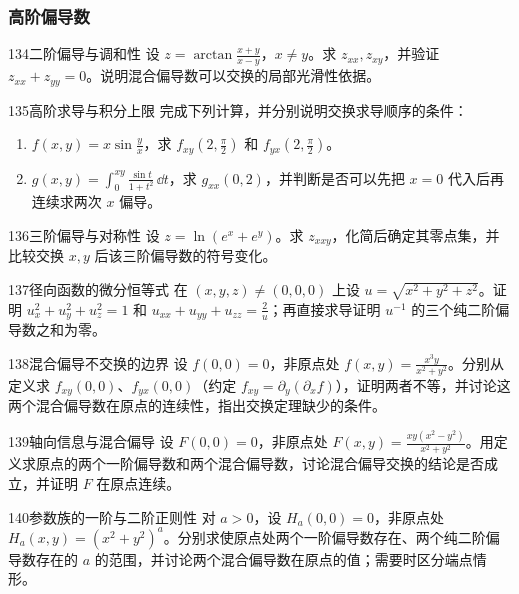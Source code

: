 \subsubsection{高阶偏导数}
\begin{exercise}{134}{二阶偏导与调和性}
设 $z=\arctan\frac{x+y}{x-y}$，$x\ne y$。求 $z_{xx},z_{xy}$，并验证 $z_{xx}+z_{yy}=0$。说明混合偏导数可以交换的局部光滑性依据。
\end{exercise}
\begin{exercise}{135}{高阶求导与积分上限}
完成下列计算，并分别说明交换求导顺序的条件：
\begin{enumerate}
\item $f(x,y)=x\sin\frac yx$，求 $f_{xy}(2,\frac\pi2)$ 和 $f_{yx}(2,\frac\pi2)$。
\item $g(x,y)=\int_0^{xy}\frac{\sin t}{1+t^2}\,\dd t$，求 $g_{xx}(0,2)$，并判断是否可以先把 $x=0$ 代入后再连续求两次 $x$ 偏导。
\end{enumerate}
\end{exercise}
\begin{exercise}{136}{三阶偏导与对称性}
设 $z=\ln(e^x+e^y)$。求 $z_{xxy}$，化简后确定其零点集，并比较交换 $x,y$ 后该三阶偏导数的符号变化。
\end{exercise}
\begin{exercise}{137}{径向函数的微分恒等式}
在 $(x,y,z)\ne(0,0,0)$ 上设 $u=\sqrt{x^2+y^2+z^2}$。证明 $u_x^2+u_y^2+u_z^2=1$ 和 $u_{xx}+u_{yy}+u_{zz}=\frac2u$；再直接求导证明 $u^{-1}$ 的三个纯二阶偏导数之和为零。
\end{exercise}
\begin{exercise}{138}{混合偏导不交换的边界}
设 $f(0,0)=0$，非原点处 $f(x,y)=\frac{x^3y}{x^2+y^2}$。分别从定义求 $f_{xy}(0,0)$、$f_{yx}(0,0)$（约定 $f_{xy}=\partial_y(\partial_x f)$），证明两者不等，并讨论这两个混合偏导数在原点的连续性，指出交换定理缺少的条件。
\end{exercise}
\begin{exercise}{139}{轴向信息与混合偏导}
设 $F(0,0)=0$，非原点处 $F(x,y)=\frac{xy(x^2-y^2)}{x^2+y^2}$。用定义求原点的两个一阶偏导数和两个混合偏导数，讨论混合偏导交换的结论是否成立，并证明 $F$ 在原点连续。
\end{exercise}
\begin{exercise}{140}{参数族的一阶与二阶正则性}
对 $a>0$，设 $H_a(0,0)=0$，非原点处 $H_a(x,y)=(x^2+y^2)^a$。分别求使原点处两个一阶偏导数存在、两个纯二阶偏导数存在的 $a$ 的范围，并讨论两个混合偏导数在原点的值；需要时区分端点情形。
\end{exercise}
